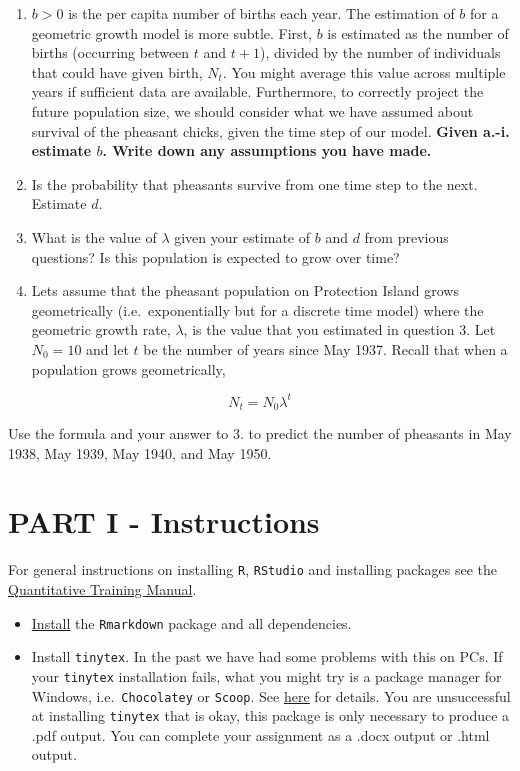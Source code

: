 \documentclass[
]{book}
\providecommand{\tightlist}{%
  \setlength{\itemsep}{0pt}\setlength{\parskip}{0pt}}
\begin{document}
\begin{enumerate}
\def\labelenumi{\arabic{enumi}.}
\item
  \(b > 0\) is the per capita number of births each year. The estimation of \(b\) for a geometric growth model is more subtle. First, \(b\) is estimated as the number of births (occurring between \(t\) and \(t+1\)), divided by the number of individuals that could have given birth, \(N_t\). You might average this value across multiple years if sufficient data are available. Furthermore, to correctly project the future population size, we should consider what we have assumed about survival of the pheasant chicks, given the time step of our model. \textbf{Given a.-i. estimate \(b\). Write down any assumptions you have made.}
\item
  Is the probability that pheasants survive from one time step to the next. Estimate \(d\).
\item
  What is the value of \(\lambda\) given your estimate of \(b\) and \(d\) from previous questions? Is this population is expected to grow over time?
\item
  Lets assume that the pheasant population on Protection Island grows geometrically (i.e.~exponentially but for a discrete time model) where the geometric growth rate, \(\lambda\), is the value that you estimated in question 3. Let \(N_0 = 10\) and let \(t\) be the number of years since May 1937. Recall that when a population grows geometrically,
\end{enumerate}

\[ N_t = N_0 \lambda^t \]

Use the formula and your answer to 3. to predict the number of pheasants in May 1938, May 1939, May 1940, and May 1950.

\hypertarget{partI}{%
\chapter*{PART I - Instructions}\label{partI}}

For general instructions on installing \texttt{R}, \texttt{RStudio} and installing packages see the \href{https://ahurford.github.io/quant-guide-all-courses/}{Quantitative Training Manual}.

\begin{itemize}
\tightlist
\item
  \href{https://ahurford.github.io/quant-guide-all-courses/install.html}{Install} the \texttt{Rmarkdown} package and all dependencies.
\item
  Install \texttt{tinytex}. In the past we have had some problems with this on PCs. If your \texttt{tinytex} installation fails, what you might try is a package manager for Windows, i.e.~\texttt{Chocolatey} or \texttt{Scoop}. See \href{https://github.com/rstudio/tinytex-releases}{here} for details. You are unsuccessful at installing \texttt{tinytex} that is okay, this package is only necessary to produce a .pdf output. You can complete your assignment as a .docx output or .html output.
\end{itemize}
\end{document}
